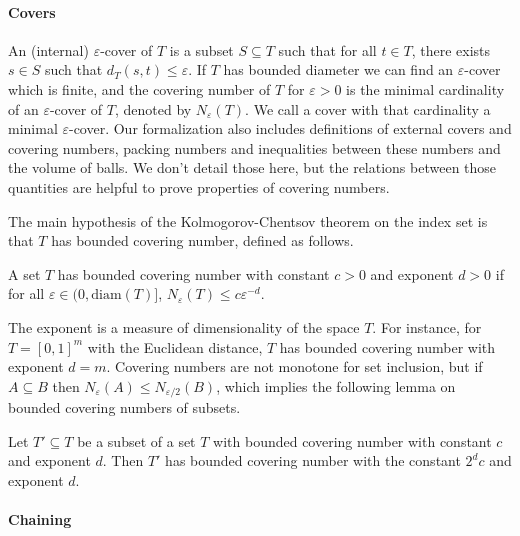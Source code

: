 \documentclass[lean]{Draft}
\makeatletter
\newcommand\leanlink{\begingroup\catcode`\#=12\relax\@leanlink}
\newcommand\@leanlink[2]{\endgroup
\href{#1}
{\texttt{\detokenize{#2}}}}
\newcommand{\docs}[1]{%
\leanlink{https://remydegenne.github.io/brownian-motion/docs/find/?pattern=#1\#doc}
{#1}}
\makeatother
\begin{document}
\paragraph{Covers}

An (internal) $\varepsilon$-cover of $T$ is a subset $S \subseteq T$ such that for all $t \in T$, there exists $s \in S$ such that $d_T(s, t) \le \varepsilon$.
If $T$ has bounded diameter we can find an $\varepsilon$-cover which is finite, and the covering number of $T$ for $\varepsilon > 0$ is the minimal cardinality of an $\varepsilon$-cover of $T$, denoted by $N_\varepsilon(T)$.
We call a cover with that cardinality a minimal $\varepsilon$-cover.
Our formalization also includes definitions of external covers and covering numbers, packing numbers and inequalities between these numbers and the volume of balls. We don't detail those here, but the relations between those quantities are helpful to prove properties of covering numbers.

The main hypothesis of the Kolmogorov-Chentsov theorem on the index set is that $T$ has bounded covering number, defined as follows.

\begin{definition}\label{def:bounded_covering_number}
A set $T$ has bounded covering number with constant $c > 0$ and exponent $d > 0$ if for all $\varepsilon \in (0, \mathrm{diam}(T)]$, $N_\varepsilon(T) \le c \varepsilon^{-d}$.
\end{definition}

The exponent is a measure of dimensionality of the space $T$.
For instance, for $T = [0,1]^m$ with the Euclidean distance, $T$ has bounded covering number with exponent $d = m$.
Covering numbers are not monotone for set inclusion, but if $A \subseteq B$ then $N_\varepsilon(A) \le N_{\varepsilon/2}(B)$, which implies the following lemma on bounded covering numbers of subsets.

\begin{lemma}[\docs{HasBoundedInternalCoveringNumber.subset}]\label{lem:covering_number_subset}
Let $T' \subseteq T$ be a subset of a set $T$ with bounded covering number with constant $c$ and exponent $d$.
Then $T'$ has bounded covering number with the constant $2^d c$ and exponent $d$.
\end{lemma}


\paragraph{Chaining}
\end{document}
